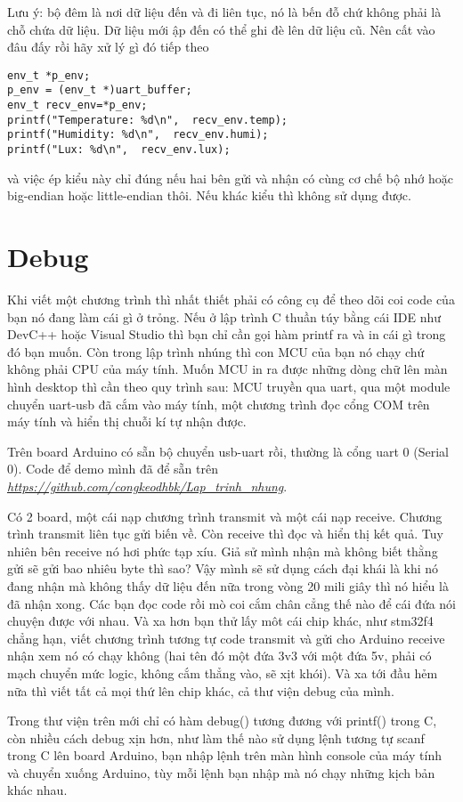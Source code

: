 Lưu ý: bộ đêm là nơi dữ liệu đến và đi liên tục, nó là bến đỗ chứ không phải là chỗ chứa dữ liệu. Dữ liệu mới ập đến có thể ghi đè lên dữ liệu cũ. Nên cất vào đâu đấy rồi hãy xử lý gì đó tiếp theo
\begin{lstlisting}
env_t *p_env;
p_env = (env_t *)uart_buffer;
env_t recv_env=*p_env;
printf("Temperature: %d\n",  recv_env.temp);
printf("Humidity: %d\n",  recv_env.humi);
printf("Lux: %d\n",  recv_env.lux);
\end{lstlisting}
và việc ép kiểu này chỉ đúng nếu hai bên gửi và nhận có cùng cơ chế bộ nhớ hoặc big-endian hoặc little-endian thôi. Nếu khác kiểu thì không sử dụng được.
\section{Debug}

Khi viết một chương trình thì nhất thiết phải có công cụ để theo dõi coi code của bạn nó đang làm cái gì ở trỏng. Nếu ở lập trình C thuần túy bằng cái IDE như DevC++ hoặc Visual Studio thì bạn chỉ cần gọi hàm printf ra và in cái gì trong đó bạn muốn. Còn trong lập trình nhúng thì con MCU của bạn nó chạy chứ không phải CPU của máy tính. Muốn MCU in ra được những dòng chữ lên màn hình desktop thì cần theo quy trình sau: MCU truyền qua uart, qua một module chuyển uart-usb đã cắm vào máy tính, một chương trình đọc cổng COM trên máy tính và hiển thị chuỗi kí tự nhận được.

Trên board Arduino có sẵn bộ chuyển usb-uart rồi, thường là cổng uart 0 (Serial 0). Code để demo mình đã để sẵn trên \textit{\url{https://github.com/congkeodhbk/Lap_trinh_nhung}}. 

Có 2 board, một cái nạp chương trình transmit và một cái nạp receive. Chương trình transmit liên tục gửi biến về. Còn receive thì đọc và hiển thị kết quả. Tuy nhiên bên receive nó hơi phức tạp xíu. Giả sử mình nhận mà không biết thằng gửi sẽ gửi bao nhiêu byte thì sao? Vậy mình sẽ sử dụng cách đại khái là khi nó đang nhận mà không thấy dữ liệu đến nữa trong vòng 20 mili giây thì nó hiểu là đã nhận xong. Các bạn đọc code rồi mò coi cắm chân cẳng thế nào để cái đứa nói chuyện được với nhau. Và xa hơn bạn thử lấy môt cái chip khác, như stm32f4 chẳng hạn, viết chương trình tương tự code transmit và gửi cho Arduino receive nhận xem nó có chạy không (hai tên đó một đứa 3v3 với một đứa 5v, phải có mạch chuyển mức logic, không cắm thẳng vào, sẽ xịt khói). Và xa tới đầu hẻm nữa thì viết tất cả mọi thứ lên chip khác, cả thư viện debug của mình.

Trong thư viện trên mới chỉ có hàm debug() tương đương với printf() trong C, còn nhiều cách debug xịn hơn, như làm thế nào sử dụng lệnh tương tự scanf trong C lên board Arduino, bạn nhập lệnh trên màn hình console của máy tính và chuyển xuống Arduino, tùy mỗi lệnh bạn nhập mà nó chạy những kịch bản khác nhau.
